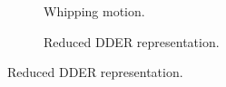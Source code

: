 \documentclass[10pt]{article}
\begin{document}
\begin{figure}[t]
\centering
\begin{subfigure}[t]{0.495\textwidth}
\centering
\resizebox{\linewidth}{!}{}
\caption{Whipping motion.}
\end{subfigure}
\hfill
\begin{subfigure}[t]{0.495\textwidth}
\centering
\resizebox{\linewidth}{!}{}
\caption{Reduced DDER representation.}
\end{subfigure}
\end{figure}
\end{document}
